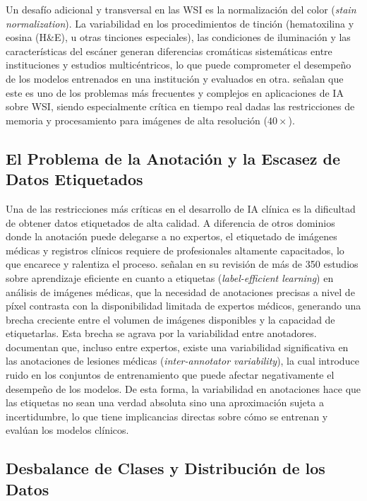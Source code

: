 Un desafío adicional y transversal en las WSI es la normalización del color (\textit{stain normalization}). La variabilidad en
los procedimientos de tinción (hematoxilina y eosina (H\&E), u otras tinciones especiales), las condiciones de iluminación y las
características del escáner generan diferencias cromáticas sistemáticas entre instituciones y estudios multicéntricos, 
lo que puede comprometer el desempeño de los modelos entrenados en una institución y evaluados en otra. 
\textcite{Basak2023} señalan que este es uno de los problemas más frecuentes y complejos en 
aplicaciones de IA sobre WSI, siendo especialmente crítica en tiempo real dadas las restricciones de memoria y procesamiento 
para imágenes de alta resolución ($40\times$).

\subsection{El Problema de la Anotación y la Escasez de Datos Etiquetados}

Una de las restricciones más críticas en el desarrollo de IA clínica es la dificultad de obtener 
datos etiquetados de alta calidad. A diferencia de otros dominios donde la anotación puede 
delegarse a no expertos, el etiquetado de imágenes médicas y registros clínicos requiere de 
profesionales altamente capacitados, lo que encarece y ralentiza el proceso. \textcite{jin2025labelefficientdeeplearningmedical} 
señalan en su revisión de más de 350 estudios sobre aprendizaje eficiente en cuanto a etiquetas 
(\textit{label-efficient learning}) en análisis de imágenes médicas, que la necesidad de anotaciones 
precisas a nivel de píxel contrasta con la disponibilidad limitada de expertos médicos, generando 
una brecha creciente entre el volumen de imágenes disponibles y la capacidad de etiquetarlas. 
Esta brecha se agrava por la variabilidad entre anotadores. \textcite{Yang2023} documentan que, 
incluso entre expertos, existe una variabilidad significativa en las anotaciones de lesiones 
médicas (\textit{inter-annotator variability}), la cual introduce ruido en los conjuntos de 
entrenamiento que puede afectar negativamente el desempeño de los modelos.
De esta forma, la variabilidad en anotaciones hace que las etiquetas no sean una verdad absoluta sino
una aproximación sujeta a incertidumbre, lo que tiene implicancias directas sobre cómo se entrenan y 
evalúan los modelos clínicos.

\subsection{Desbalance de Clases y Distribución de los Datos}

